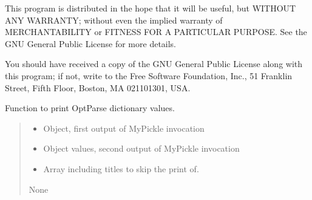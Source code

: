 \documentclass[letterpaper,10pt,english]{sphinxmanual}
\begin{document}
\sphinxAtStartPar
This program is distributed in the hope that it will be useful,
but WITHOUT ANY WARRANTY; without even the implied warranty of
MERCHANTABILITY or FITNESS FOR A PARTICULAR PURPOSE.  See the
GNU General Public License for more details.

\sphinxAtStartPar
You should have received a copy of the GNU General Public License
along with this program; if not, write to the Free Software
Foundation, Inc., 51 Franklin Street, Fifth Floor, Boston, MA  02110\sphinxhyphen{}1301, USA.

\begin{fulllineitems}
\label{\detokenize{api/killMS.Other:killMS.Other.PrintOptParse.PrintOptParse}}
\pysigstartsignatures
{}
\pysigstopsignatures
\sphinxAtStartPar
Function to print OptParse dictionary values.
\begin{quote}\begin{description}
\begin{itemize}
\item {} 
\sphinxAtStartPar
{} \textendash{} Object, first output of MyPickle invocation

\item {} 
\sphinxAtStartPar
{} \textendash{} Object values, second output of MyPickle invocation

\item {} 
\sphinxAtStartPar
{} \textendash{} Array including titles to skip the print of.

\end{itemize}

\sphinxAtStartPar
None

\end{description}\end{quote}

\end{fulllineitems}

\end{document}
